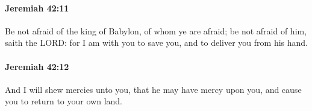 		\paragraph{Jeremiah 42:11} %
			\label{JEREMIAH-42-11}

			Be not afraid of the king of Babylon, of whom ye are afraid; be not afraid of him, saith the LORD: for I am with you to save you, and to deliver you from his hand.


		\paragraph{Jeremiah 42:12} %
			\label{JEREMIAH-42-12}

			And I will shew mercies unto you, that he may have mercy upon you, and cause you to return to your own land.


